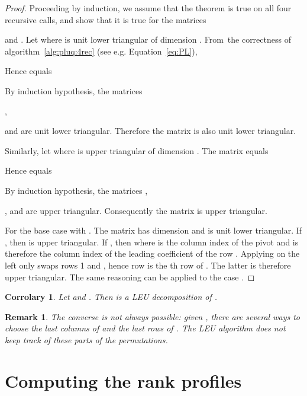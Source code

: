 \documentclass{article}
\newtheorem{corrolary}{Corrolary}
\newtheorem{remark}{Remark}
\begin{document}
\begin{proof}
Proceeding by induction, we assume that the theorem is true on all four
recursive calls, and show that it is true for the matrices 

and 
.
Let 
where  is unit lower triangular of dimension .
From~the correctness of algorithm~\ref{alg:pluq:4rec} (see e.g. Equation~\ref{eq:PL}),



Hence  equals

By induction hypothesis, the matrices


,

and
 are unit lower triangular. Therefore the matrix   is also unit lower triangular.

Similarly, let 
where  is upper triangular of dimension .
The matrix  equals

Hence  equals
  
By induction hypothesis, the matrices
,

, 
and
 are upper triangular.
Consequently the matrix   is upper triangular.

For the base case with . The matrix  has dimension  and is unit lower triangular. If , then  is
upper triangular. If , then  where  is the column index of
the pivot and is therefore the column index of the  leading coefficient of the row
. Applying  on the left only swaps rows 1
  and , hence row  is the th row of
    . The latter is
therefore upper triangular. The same reasoning can be applied to the case .
\end{proof}
\begin{corrolary}\label{cor:leu}
  Let  and .
Then  is a LEU decomposition of .
\end{corrolary}




\begin{remark}
The converse is not always possible: given , there are
several ways to choose the last  columns of  and the last  rows of
. The LEU algorithm does not keep track of these parts of
the permutations.
\end{remark}


 \section{Computing the rank profiles}
\label{sec:rp}
\end{document}
